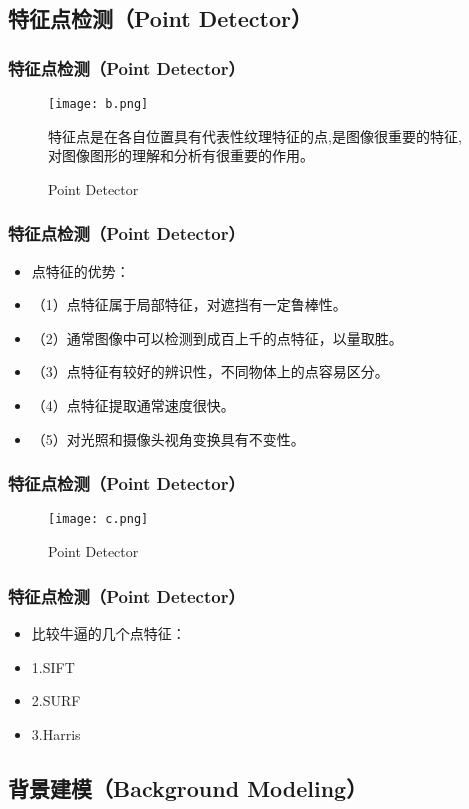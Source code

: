 \documentclass[notheorems,mathserif,table,compress]{beamer}  %
\begin{document}
\subsection{特征点检测（Point Detector）}

\begin{frame}
  \frametitle{特征点检测（Point Detector）}  
  \begin{figure}[!ht]
  \centering\texttt{[image: b.png]}
  \caption{Point Detector}
  \item 特征点是在各自位置具有代表性纹理特征的点,是图像很重要的特征,对图像图形的理解和分析有很重要的作用。
  \end{figure}
\end{frame}%

\begin{frame}
  \frametitle{特征点检测（Point Detector）}  
  \begin{itemize}
  \item 点特征的优势：
  \item （1）点特征属于局部特征，对遮挡有一定鲁棒性。
  \item （2）通常图像中可以检测到成百上千的点特征，以量取胜。
  \item （3）点特征有较好的辨识性，不同物体上的点容易区分。
  \item （4）点特征提取通常速度很快。
  \item （5）对光照和摄像头视角变换具有不变性。
  \end{itemize}
\end{frame}

\begin{frame}
  \frametitle{特征点检测（Point Detector）}  
  \begin{figure}[!ht]
  \centering\texttt{[image: c.png]}
  \caption{Point Detector}
  \end{figure}
\end{frame}

\begin{frame}
  \frametitle{特征点检测（Point Detector）}  
  \begin{itemize}
  \item 比较牛逼的几个点特征：
  \item 1.SIFT
  \item 2.SURF
  \item 3.Harris
  \end{itemize}
\end{frame}%

\subsection{背景建模（Background Modeling）}
\end{document}
